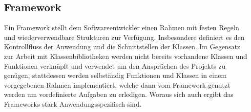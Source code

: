 \subsection{Framework}
Ein Framework stellt dem Softwareentwickler einen Rahmen mit festen Regeln und wiederverwendbare Strukturen zur Verfügung. Insbesondere definiert es den Kontrollfluss der Anwendung und die Schnittstellen der Klassen. Im Gegensatz zur Arbeit mit Klassenbibliotheken werden nicht bereits vorhandene Klassen und Funktionen verknüpft und verwendet um den Ansprüchen des Projekts zu genügen, stattdessen werden selbständig Funktionen und Klassen in einem vorgegebenen Rahmen implementiert, welche dann vom Framework genutzt werden um vordefinierte Aufgaben zu erledigen. Woraus sich auch ergibt das Frameworks stark Anwendungsspezifisch sind. \cite{frameworkwiki}